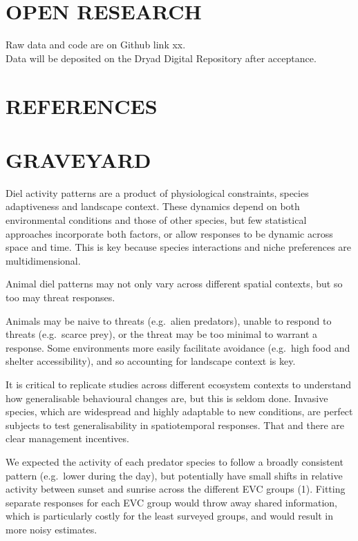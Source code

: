 \documentclass[]{elsarticle} %
\begin{document}
\hypertarget{open-research}{%
\section{OPEN RESEARCH}\label{open-research}}

Raw data and code are on Github link xx.\\
Data will be deposited on the Dryad Digital Repository after acceptance.

\newpage

\hypertarget{references}{%
\section*{REFERENCES}\label{references}}

\hypertarget{graveyard}{%
\section{GRAVEYARD}\label{graveyard}}

Diel activity patterns are a product of physiological constraints, species adaptiveness and landscape context. These dynamics depend on both environmental conditions and those of other species, but few statistical approaches incorporate both factors, or allow responses to be dynamic across space and time. This is key because species interactions and niche preferences are multidimensional.

Animal diel patterns may not only vary across different spatial contexts, but so too may threat responses.

Animals may be naive to threats (e.g.~alien predators), unable to respond to threats (e.g.~scarce prey), or the threat may be too minimal to warrant a response. Some environments more easily facilitate avoidance (e.g.~high food and shelter accessibility), and so accounting for landscape context is key.

It is critical to replicate studies across different ecosystem contexts to understand how generalisable behavioural changes are, but this is seldom done. Invasive species, which are widespread and highly adaptable to new conditions, are perfect subjects to test generalisability in spatiotemporal responses. That and there are clear management incentives.

We expected the activity of each predator species to follow a broadly consistent pattern (e.g.~lower during the day), but potentially have small shifts in relative activity between sunset and sunrise across the different EVC groups (1). Fitting separate responses for each EVC group would throw away shared information, which is particularly costly for the least surveyed groups, and would result in more noisy estimates.
\end{document}
